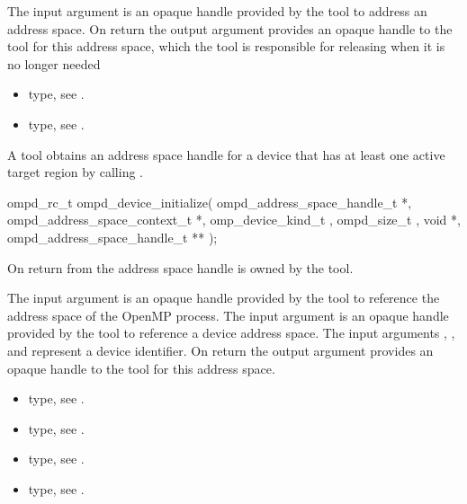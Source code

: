 \argdesc
The input argument  is an opaque handle provided by the tool
to address an address space.
On return the output argument  provides an opaque handle to the
tool for this address space, which the tool is responsible for 
releasing when it is no longer needed

\crossreferences
\begin{itemize}
	\item {} type, see 
	.
	\item {} type, see 
	.
\end{itemize}


\label{ompd:ompd_device_initialize}
\summary
A tool obtains an address space handle for a device that has
at least one active target region by calling
.

\format

\begin{cspecific}
\begin{ompSyntax}
ompd_rc_t ompd_device_initialize(
  ompd_address_space_handle_t *,
  ompd_address_space_context_t *,
  omp_device_kind_t  ,
  ompd_size_t  ,
  void *,
  ompd_address_space_handle_t **
);
\end{ompSyntax}
\end{cspecific}


\descr
On return from  the address
space handle is owned by the tool.

\argdesc

The input argument  is an opaque handle provided by the tool
to reference the address space of the OpenMP process.
The input argument  is an opaque handle provided by the tool
to reference a device address space.
The input arguments ,  , and  represent a device identifier. 
On return the output argument  provides an opaque handle to the
tool for this address space.

\crossreferences
\begin{itemize}
	\item {} type, see 
	.
	\item {} type, see .
	\item {} type, see .
	\item {} type, see 
	.
\end{itemize}


